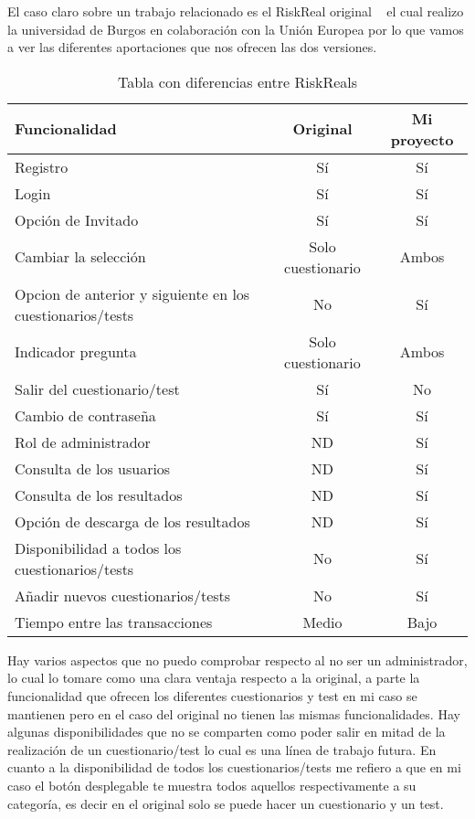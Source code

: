 
El caso claro sobre un trabajo relacionado es el RiskReal original ~\cite{RiskReal} el cual realizo la universidad de Burgos en colaboración con la Unión Europea  por lo que vamos a ver las diferentes aportaciones que nos ofrecen las dos versiones.

\noindent
\begin{table}[]
    \centering
    \begin{tabularx}{\textwidth}{|X|c|c|}
        \hline
        Funcionalidad & Original & Mi proyecto \\ \hline
        Registro & Sí & Sí \\
        Login & Sí & Sí\\
        Opción de Invitado & Sí & Sí\\
        Cambiar la selección & Solo cuestionario & Ambos \\
        Opcion de anterior y siguiente en los cuestionarios/tests & No & Sí\\
        Indicador pregunta & Solo cuestionario & Ambos \\
        Salir del cuestionario/test & Sí & No \\
        Cambio de contraseña & Sí & Sí\\
        Rol de administrador & ND & Sí\\
        Consulta de los usuarios & ND & Sí\\
        Consulta de los resultados & ND & Sí\\
        Opción de descarga de los resultados & ND & Sí\\
        Disponibilidad a todos los cuestionarios/tests & No & Sí\\
        Añadir nuevos cuestionarios/tests & No & Sí\\
        Tiempo entre las transacciones & Medio & Bajo \\ \hline
    \end{tabularx}
    \caption{Tabla con diferencias entre RiskReals}
    \label{tab:my_label}
\end{table}

Hay varios aspectos que no puedo comprobar respecto al no ser un administrador, lo cual lo tomare como una clara ventaja respecto a la original, a parte la funcionalidad que ofrecen los diferentes cuestionarios y test en mi caso se mantienen pero en el caso del original no tienen las mismas funcionalidades.
Hay algunas disponibilidades que no se comparten como poder salir en mitad de la realización de un cuestionario/test lo cual es una línea de trabajo futura.
En cuanto a la disponibilidad de todos los cuestionarios/tests me refiero a que en mi caso el botón desplegable te muestra todos aquellos respectivamente a su categoría, es decir en el original solo se puede hacer un cuestionario y un test.